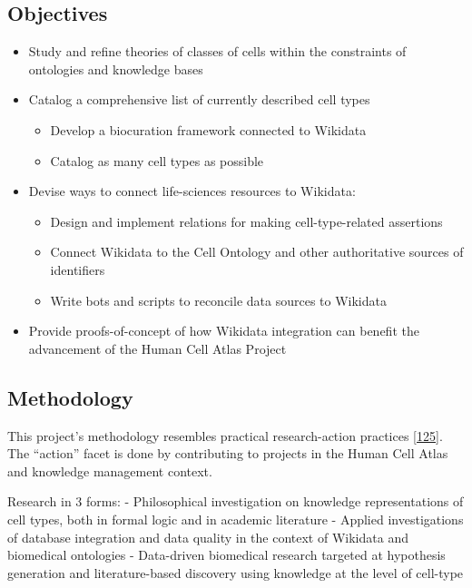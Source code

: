 \hypertarget{objectives}{%
\subsection{Objectives}\label{objectives}}

\begin{itemize}
\item
  Study and refine theories of classes of cells within the constraints of ontologies and knowledge bases
\item
  Catalog a comprehensive list of currently described cell types

  \begin{itemize}
  \tightlist
  \item
    Develop a biocuration framework connected to Wikidata
  \item
    Catalog as many cell types as possible
  \end{itemize}
\item
  Devise ways to connect life-sciences resources to Wikidata:

  \begin{itemize}
  \tightlist
  \item
    Design and implement relations for making cell-type-related assertions
  \item
    Connect Wikidata to the Cell Ontology and other authoritative sources of identifiers
  \item
    Write bots and scripts to reconcile data sources to Wikidata
  \end{itemize}
\item
  Provide proofs-of-concept of how Wikidata integration can benefit the advancement of the Human Cell Atlas Project
\end{itemize}

\hypertarget{methodology}{%
\subsection{Methodology}\label{methodology}}

This project's methodology resembles practical research-action practices {[}\protect\hyperlink{ref-11UV98PHT}{125}{]}.
The ``action'' facet is done by contributing to projects in the Human Cell Atlas and knowledge management context.

Research in 3 forms:
- Philosophical investigation on knowledge representations of cell types, both in formal logic and in academic literature
- Applied investigations of database integration and data quality in the context of Wikidata and biomedical ontologies
- Data-driven biomedical research targeted at hypothesis generation and literature-based discovery using knowledge at the level of cell-type

